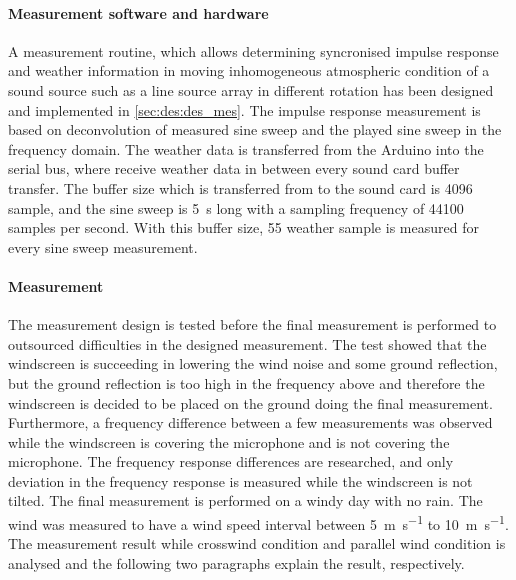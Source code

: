 \paragraph{Measurement software and hardware}
A measurement routine, which allows determining syncronised impulse response and weather information in moving inhomogeneous atmospheric condition of a sound source such as a line source array in different rotation has been designed and implemented in \matlab \autoref{sec:des:des_mes}. The impulse response measurement is based on deconvolution of measured sine sweep and the played sine sweep in the frequency domain. The weather data is transferred from the Arduino into the serial bus, where \matlab receive weather data in between every sound card buffer transfer. The buffer size which is transferred from \matlab to the sound card is 4096 sample, and the sine sweep is \SI{5}{\second} long with a sampling frequency of 44100 samples per second. With this buffer size, 55 weather sample is measured for every sine sweep measurement. 



\paragraph{Measurement}
The measurement design is tested before the final measurement is performed to outsourced difficulties in the designed measurement. The test showed that the windscreen is succeeding in lowering the wind noise and some ground reflection, but the ground reflection is too high in the frequency above  and therefore the windscreen is decided to be placed on the ground doing the final measurement. Furthermore, a frequency difference between a few measurements was observed while the windscreen is covering the microphone and is not covering the microphone. The frequency response differences are researched, and only  deviation in the frequency response is measured while the windscreen is not tilted.  The final measurement is performed on a windy day with no rain. The wind was measured to have a wind speed interval between \SI{5}{\meter\per\second} to \SI{10}{\meter\per\second}. The measurement result while crosswind condition and parallel wind condition is analysed and the following two paragraphs explain the result, respectively.



